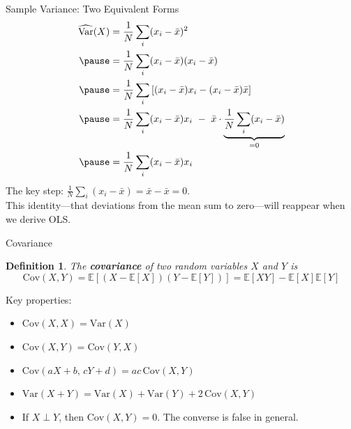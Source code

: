 \documentclass[aspectratio=169, handout, t]{beamer}
\newtheorem{defn}{Definition}
\numberwithin{equation}{section}
\begin{document}
\begin{frame}{Sample Variance: Two Equivalent Forms}
\footnotesize
\begin{align*}
\widehat{\text{Var}}(X)&=\frac{1}{N}\sum_i(x_i-\bar{x})^2\\\pause
&=\frac{1}{N}\sum_i(x_i-\bar{x})(x_i-\bar{x})\\\pause
&=\frac{1}{N}\sum_i\left[(x_i-\bar{x})x_i-(x_i-\bar{x})\bar{x}\right]\\\pause
&=\frac{1}{N}\sum_i(x_i-\bar{x})x_i\ -\ \bar{x}\cdot\underbrace{\frac{1}{N}\sum_i(x_i-\bar{x})}_{=0}\\\pause
&=\frac{1}{N}\sum_i(x_i-\bar{x})x_i
\end{align*}\pause
\small
The key step: $\frac{1}{N}\sum_i(x_i-\bar{x})=\bar{x}-\bar{x}=0$.\\
This identity---that deviations from the mean sum to zero---will reappear when we derive OLS.
\end{frame}


\begin{frame}{Covariance}
\begin{defn}
The \textbf{covariance} of two random variables $X$ and $Y$ is
$$\text{Cov}(X,Y)=\mathbb{E}[(X-\mathbb{E}[X])(Y-\mathbb{E}[Y])]=\mathbb{E}[XY]-\mathbb{E}[X]\mathbb{E}[Y]$$
\end{defn}\pause
Key properties:
\begin{itemize}
\item $\text{Cov}(X,X)=\text{Var}(X)$
\item $\text{Cov}(X,Y)=\text{Cov}(Y,X)$
\item $\text{Cov}(aX+b,\,cY+d)=ac\,\text{Cov}(X,Y)$
\item $\text{Var}(X+Y)=\text{Var}(X)+\text{Var}(Y)+2\,\text{Cov}(X,Y)$\pause
\item If $X\perp Y$, then $\text{Cov}(X,Y)=0$. The converse is false in general.
\end{itemize}
\end{frame}
\end{document}
